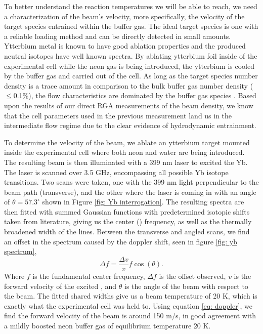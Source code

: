 To better understand the reaction temperatures we will be able to reach, we need a characterization of the beam's velocity, more specifically, the velocity of the target species entrained within the buffer gas. The ideal target species is one with a reliable loading method and can be directly detected in small amounts. Ytterbium metal is known to have good ablation properties and the produced neutral isotopes have well known spectra. By ablating ytterbium foil inside of the experimental cell while the neon gas is being introduced, the ytterbium is cooled by the buffer gas and carried out of the cell. As long as the target species number density is a trace amount in comparison to the bulk buffer gas number density ($\leq$0.1\%), the flow characteristics are dominated by the buffer gas species \cite{Hutzler2012}. Based upon the results of our direct RGA measurements of the beam density, we know that the cell parameters used in the previous measurement land us in the intermediate flow regime due to the clear evidence of hydrodynamic entrainment.

To determine the velocity of the beam, we ablate an ytterbium target mounted inside the experimental cell where both neon and water are being introduced. The resulting beam is then illuminated with a 399 nm laser to excited the Yb. The laser is scanned over 3.5 GHz, encompassing all possible Yb isotope transitions. Two scans were taken, one with the 399 nm light perpendicular to the beam path (transverse), and the other where the laser is coming in with an angle of $\theta=57.3^\circ$ shown in Figure \ref{fig: Yb interrogation}. The resulting spectra are then fitted with summed Gaussian functions with predetermined isotopic shifts taken from literature, giving us the center () frequency, as well as the thermally broadened width of the lines. Between the transverse and angled scans, we find an offset in the spectrum caused by the doppler shift, seen in figure \ref{fig: yb spectrum},
\begin{equation}
	\Delta f = \frac{\Delta v}{v} f \cos(\theta).
	\label{eq: doppler}
\end{equation}
Where $f$ is the fundamental center frequency, $\Delta f$ is the offset observed, $v$ is the forward velocity of the excited , and $\theta$ is the angle of the beam with respect to the beam. The fitted shared widths give us a beam temperature of 20 K, which is exactly what the experimental cell was held to. Using equation \ref{eq: doppler}, we find the forward velocity of the beam is around 150 m/s, in good agreement with a mildly boosted neon buffer gas of equilibrium temperature 20 K. 

